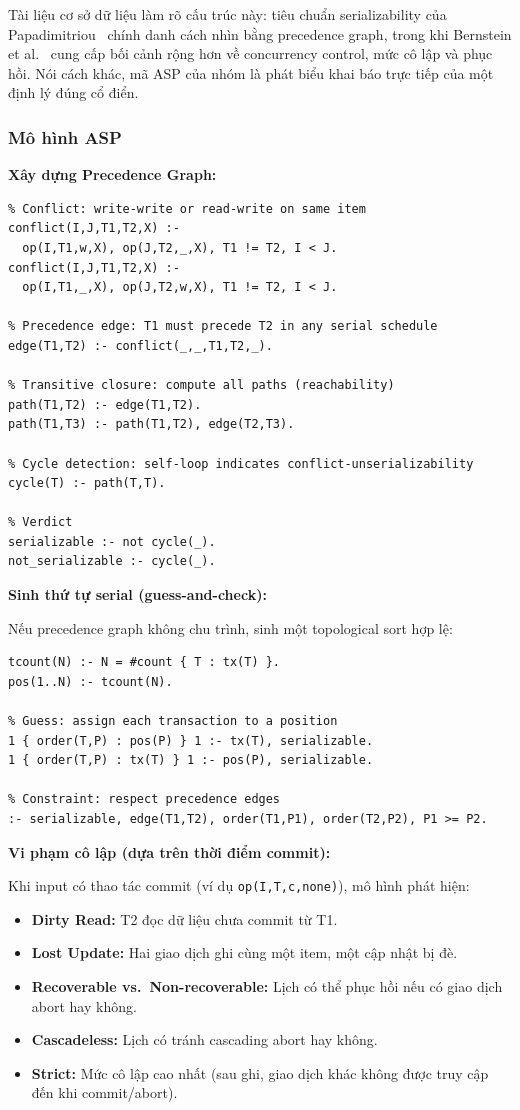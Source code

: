 \documentclass[a4paper,11pt]{article}
\begin{document}
Tài liệu cơ sở dữ liệu làm rõ cấu trúc này: tiêu chuẩn serializability của Papadimitriou~\cite{Papadimitriou1979}
chính danh cách nhìn bằng precedence graph, trong khi Bernstein et al.~\cite{Bernstein1987}
cung cấp bối cảnh rộng hơn về concurrency control, mức cô lập và phục hồi. Nói cách khác,
mã ASP của nhóm là phát biểu khai báo trực tiếp của một định lý đúng cổ điển.

\subsubsection*{Mô hình ASP}

\textbf{Xây dựng Precedence Graph:}
\begin{lstlisting}
% Conflict: write-write or read-write on same item
conflict(I,J,T1,T2,X) :- 
  op(I,T1,w,X), op(J,T2,_,X), T1 != T2, I < J.
conflict(I,J,T1,T2,X) :- 
  op(I,T1,_,X), op(J,T2,w,X), T1 != T2, I < J.

% Precedence edge: T1 must precede T2 in any serial schedule
edge(T1,T2) :- conflict(_,_,T1,T2,_).

% Transitive closure: compute all paths (reachability)
path(T1,T2) :- edge(T1,T2).
path(T1,T3) :- path(T1,T2), edge(T2,T3).

% Cycle detection: self-loop indicates conflict-unserializability
cycle(T) :- path(T,T).

% Verdict
serializable :- not cycle(_).
not_serializable :- cycle(_).
\end{lstlisting}

\textbf{Sinh thứ tự serial (guess-and-check):}

Nếu precedence graph không chu trình, sinh một topological sort hợp lệ:
\begin{lstlisting}
tcount(N) :- N = #count { T : tx(T) }.
pos(1..N) :- tcount(N).

% Guess: assign each transaction to a position
1 { order(T,P) : pos(P) } 1 :- tx(T), serializable.
1 { order(T,P) : tx(T) } 1 :- pos(P), serializable.

% Constraint: respect precedence edges
:- serializable, edge(T1,T2), order(T1,P1), order(T2,P2), P1 >= P2.
\end{lstlisting}

\textbf{Vi phạm cô lập (dựa trên thời điểm commit):}

Khi input có thao tác commit (ví dụ \texttt{op(I,T,c,none)}),
mô hình phát hiện:
\begin{itemize}
  \item \textbf{Dirty Read:} T2 đọc dữ liệu chưa commit từ T1.
  \item \textbf{Lost Update:} Hai giao dịch ghi cùng một item, một cập nhật bị đè.
  \item \textbf{Recoverable vs.~Non-recoverable:} Lịch có thể phục hồi nếu có giao dịch abort hay không.
  \item \textbf{Cascadeless:} Lịch có tránh cascading abort hay không.
  \item \textbf{Strict:} Mức cô lập cao nhất (sau ghi, giao dịch khác không được truy cập đến khi commit/abort).
\end{itemize}
\end{document}
